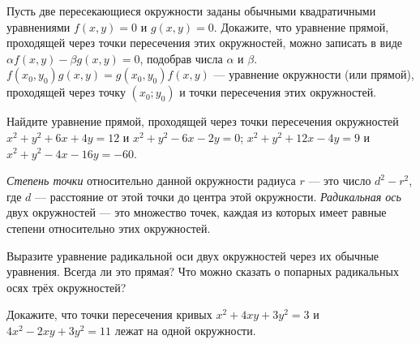 \documentclass[a4paper, 12pt]{article}
\begin{document}


\noindent


Пусть две пересекающиеся окружности заданы обычными квадратичными уравнениями
$f(x,y)=0$ и $g(x,y)=0$. Докажите, что 
уравнение прямой, проходящей через точки пересечения этих окружностей, можно записать в виде $\alpha f(x,y)-\beta g(x,y)=0$, подобрав числа $\alpha$ и $\beta$.
$f(x_0,y_0)g(x,y)=g(x_0,y_0)f(x,y)$ --- уравнение окружности (или прямой), проходящей через точку $(x_0;y_0)$ и точки пересечения этих окружностей.

Найдите уравнение прямой, проходящей через точки пересечения окружностей \\
 $x^2+y^2+6x+4y=12$ и $x^2+y^2-6x-2y=0$;
 $x^2+y^2+12x-4y=9$ и $x^2+y^2-4x-16y=-60$.


{\it Степень точки} относительно данной окружности радиуса $r$ --- это число $d^2-r^2$, где $d$ ---
расстояние от этой точки до центра этой окружности.
{\it Радикальная ось} двух окружностей --- это множество точек, каждая из которых имеет равные степени
относительно этих окружностей.

 Выразите уравнение радикальной оси двух окружностей через их обычные уравнения.
 Всегда ли это прямая?  Что можно сказать о попарных радикальных осях трёх окружностей?

Докажите, что точки пересечения
кривых $x^2+4xy+3y^2=3$ и $4x^2-2xy+3y^2=11$
лежат на одной окружности. 
\end{document}
